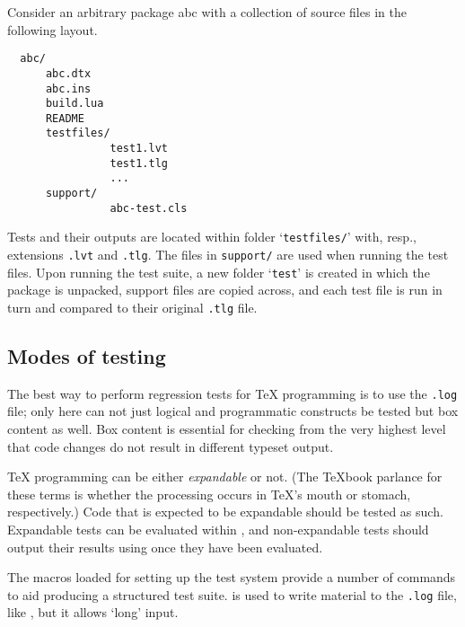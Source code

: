\documentclass[a4paper]{ltugboat}
\begin{document}
Consider an arbitrary package \textsf{abc} with a collection of source files in the following layout.
\begin{Verbatim}
  abc/
      abc.dtx
      abc.ins
      build.lua
      README
      testfiles/
                test1.lvt
                test1.tlg
                ...
      support/
                abc-test.cls
\end{Verbatim}
Tests and their outputs are located within folder `\texttt{testfiles/}' with, resp., extensions \texttt{.lvt} and \texttt{.tlg}.
The files in \texttt{support/} are used when running the test files.
Upon running the test suite, a new folder `\texttt{test}' is created in which the package is unpacked, support files are copied across, and each test file is run in turn and compared to their original \texttt{.tlg} file.

\subsection{Modes of testing}

The best way to perform regression tests for \TeX{} programming is to use the \texttt{.log} file; only here can not just logical and programmatic constructs be tested but box content as well.
Box content is essential for checking from the very highest level that code changes do not result in different typeset output.

\TeX{} programming can be either \emph{expandable} or not.
(The \TeX book parlance for these terms is whether the processing occurs in \TeX's mouth or stomach, respectively.)
Code that is expected to be expandable should be tested as such.
Expandable tests can be evaluated within , and non-expandable tests should output their results using  once they have been evaluated.

The macros loaded for setting up the test system provide a number of commands to aid producing a structured test suite.  is used to write material to the \texttt{.log} file, like , but it allows `long' input.
\end{document}
